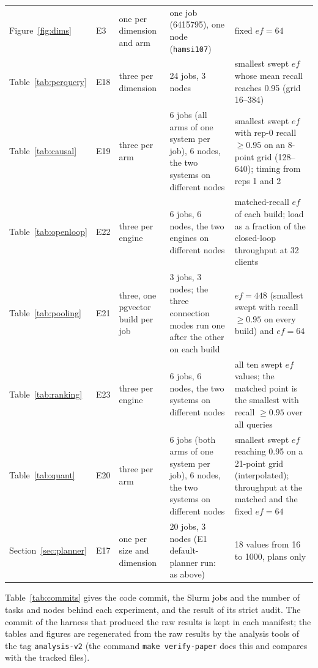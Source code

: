 \documentclass[preprint,12pt]{elsarticle}
\begin{document}
\begin{table}[t]
\begin{tabular}{p{}p{}p{}p{}p{}}
    Figure~\ref{fig:dims} & E3 & one per dimension and arm & one job (6415795), one node
      (\texttt{hamsi107}) & fixed $ef=64$ \\
    Table~\ref{tab:perquery} & E18 & three per dimension & 24 jobs, 3 nodes & smallest swept $ef$
      whose mean recall reaches 0.95 (grid 16--384) \\
    Table~\ref{tab:causal} & E19 & three per arm & 6 jobs (all arms of one system per job), 6 nodes,
      the two systems on different nodes & smallest swept $ef$ with rep-0 recall $\ge 0.95$ on an 8-point grid
      (128--640); timing from reps 1 and 2 \\
    Table~\ref{tab:openloop} & E22 & three per engine & 6 jobs, 6 nodes, the two engines on different nodes & matched-recall $ef$ of each build;
      load as a fraction of the closed-loop throughput at 32 clients \\
    Table~\ref{tab:pooling} & E21 & three, one pgvector build per job & 3 jobs, 3 nodes; the three connection modes run
      one after the other on each build & $ef=448$ (smallest swept with recall $\ge 0.95$ on every build) and $ef=64$ \\
    Table~\ref{tab:ranking} & E23 & three per engine & 6 jobs, 6 nodes, the two systems on different nodes &
      all ten swept $ef$ values; the matched point is the smallest with recall $\ge 0.95$ over all queries \\
    Table~\ref{tab:quant} & E20 & three per arm & 6 jobs (both arms of one system per job), 6 nodes,
      the two systems on different nodes & smallest swept $ef$ reaching 0.95 on a 21-point grid
      (interpolated); throughput at the matched and the fixed $ef=64$ \\
    Section~\ref{sec:planner} & E17 & one per size and dimension & 20 jobs, 3 nodes (E1 default-planner
      run: as above) & 18 values from 16 to 1000, plans only \\
    \bottomrule
  \end{tabular}
\end{table}

Table~\ref{tab:commits} gives the code commit, the Slurm jobs and the number of tasks and nodes behind each experiment, and the result of its strict audit.
The commit of the harness that produced the raw results is kept in each manifest; the tables and figures are regenerated from the raw results by the analysis
tools of the tag \texttt{analysis-v2} (the command \texttt{make verify-paper} does this and compares with the tracked files).
\end{document}
